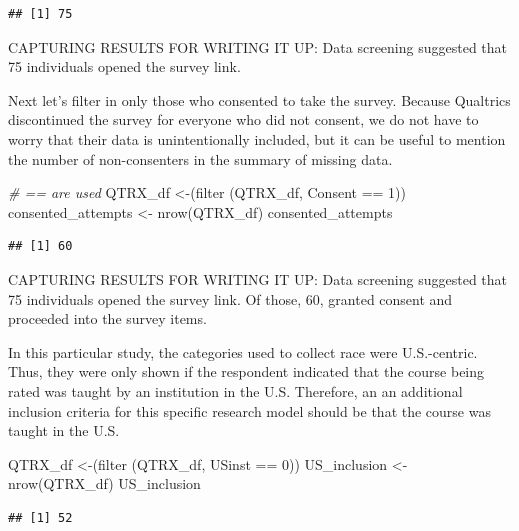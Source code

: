 \documentclass[
  11pt,
]{book}
\newenvironment{Shaded}{\begin{snugshade}}{\end{snugshade}}
\newcommand{\CommentTok}[1]{\textcolor[rgb]{0.56,0.35,0.01}{\textit{#1}}}
\newcommand{\DecValTok}[1]{\textcolor[rgb]{0.00,0.00,0.81}{#1}}
\newcommand{\FunctionTok}[1]{\textcolor[rgb]{0.00,0.00,0.00}{#1}}
\newcommand{\NormalTok}[1]{#1}
\newcommand{\OtherTok}[1]{\textcolor[rgb]{0.56,0.35,0.01}{#1}}
\newcommand{\SpecialCharTok}[1]{\textcolor[rgb]{0.00,0.00,0.00}{#1}}
\begin{document}
\begin{verbatim}
## [1] 75
\end{verbatim}

CAPTURING RESULTS FOR WRITING IT UP: Data screening suggested that 75 individuals opened the survey link.

Next let's filter in only those who consented to take the survey. Because Qualtrics discontinued the survey for everyone who did not consent, we do not have to worry that their data is unintentionally included, but it can be useful to mention the number of non-consenters in the summary of missing data.

\begin{Shaded}
\begin{Highlighting}[]
\CommentTok{\# == are used }
\NormalTok{QTRX\_df }\OtherTok{\textless{}{-}}\NormalTok{(}\FunctionTok{filter}\NormalTok{ (QTRX\_df, Consent }\SpecialCharTok{==} \DecValTok{1}\NormalTok{))}
\NormalTok{consented\_attempts }\OtherTok{\textless{}{-}} \FunctionTok{nrow}\NormalTok{(QTRX\_df)}
\NormalTok{consented\_attempts}
\end{Highlighting}
\end{Shaded}

\begin{verbatim}
## [1] 60
\end{verbatim}

CAPTURING RESULTS FOR WRITING IT UP: Data screening suggested that 75 individuals opened the survey link. Of those, 60, granted consent and proceeded into the survey items.

In this particular study, the categories used to collect race were U.S.-centric. Thus, they were only shown if the respondent indicated that the course being rated was taught by an institution in the U.S. Therefore, an an additional inclusion criteria for this specific research model should be that the course was taught in the U.S.

\begin{Shaded}
\begin{Highlighting}[]
\NormalTok{QTRX\_df }\OtherTok{\textless{}{-}}\NormalTok{(}\FunctionTok{filter}\NormalTok{ (QTRX\_df, USinst }\SpecialCharTok{==} \DecValTok{0}\NormalTok{))}
\NormalTok{US\_inclusion }\OtherTok{\textless{}{-}} \FunctionTok{nrow}\NormalTok{(QTRX\_df)}
\NormalTok{US\_inclusion}
\end{Highlighting}
\end{Shaded}

\begin{verbatim}
## [1] 52
\end{verbatim}
\end{document}
